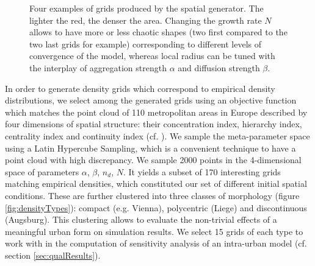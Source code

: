 \documentclass[3p,times,procedia]{elsarticle}
\begin{document}
\begin{figure}[htbp] \begin{center} 
 \caption{Four examples of grids produced by the spatial generator. The lighter the red, the denser the area. Changing the growth rate $N$ allows to have more or less chaotic shapes (two first compared to the two last grids for example) corresponding to different levels of convergence of the model, whereas local radius can be tuned with the interplay of aggregation strength $\alpha$ and diffusion strength $\beta$.} \label{fig:spatialGen} \end{center} \end{figure} %



In order to generate density grids which correspond to empirical density distributions, we select among the generated grids using an objective function which matches the point cloud of 110 metropolitan areas in Europe described by four dimensions of spatial structure: their concentration index, hierarchy index, centrality index and continuity index (cf. \cite{LeNechet2015}). We sample the meta-parameter space using a Latin Hypercube Sampling, which is a convenient technique to have a point cloud with high discrepancy. We sample 2000 points in the 4-dimensional space of parameters {$\alpha$, $\beta$, $n_d$, $N$}. It yields a subset of 170 interesting grids matching empirical densities, which constituted our set of different initial spatial conditions. These are further clustered into three classes of morphology (figure \ref{fig:densityTypes}): compact (e.g. Vienna), polycentric (Liege) and discontinuous (Augsburg). This clustering allows to evaluate the non-trivial effects of a meaningful urban form on simulation results. We select 15 grids of each type to work with in the computation of sensitivity analysis of an intra-urban model (cf. section \ref{sec:qualResults}).
\end{document}
